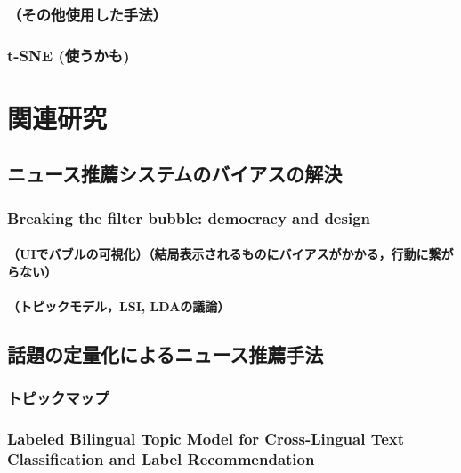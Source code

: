 \documentclass[12pt,a4j]{jreport}
\begin{document}
\subsection{（その他使用した手法）}


\subsection{t-SNE (使うかも)}



\chapter{関連研究}


\section{ニュース推薦システムのバイアスの解決}


\subsection{Breaking the filter bubble: democracy and design}


\subsubsection{（UIでバブルの可視化）（結局表示されるものにバイアスがかかる，行動に繋がらない）}


\subsubsection{（トピックモデル，LSI, LDAの議論）}


\section{話題の定量化によるニュース推薦手法}


\subsection{トピックマップ}


\subsection{Labeled Bilingual Topic Model for Cross-Lingual Text Classification and Label Recommendation}
\end{document}
